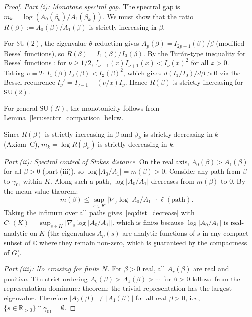\documentclass[12pt]{article}
\theoremstyle{definition}
\theoremstyle{remark}
\newcommand{\SU}{\mathrm{SU}}
\newcommand{\R}{\mathbb{R}}
\newcommand{\C}{\mathbb{C}}
\begin{document}
\begin{proof}
\emph{Part (i): Monotone spectral gap.}
The spectral gap is $m_k = \log(A_0(\beta_k)/A_1(\beta_k))$.
We must show that the ratio $R(\beta) := A_0(\beta)/A_1(\beta)$ is
strictly increasing in $\beta$.

For $\SU(2)$, the eigenvalue $\theta$ reduction gives
$A_p(\beta) = I_{2p+1}(\beta)/\beta$ (modified Bessel functions),
so $R(\beta) = I_1(\beta)/I_3(\beta)$.
By the Tur\'an-type inequality for Bessel functions
\cite{Baricz2008}: for $\nu \ge 1/2$,
$I_{\nu-1}(x) I_{\nu+1}(x) < I_\nu(x)^2$ for all $x > 0$.
Taking $\nu = 2$: $I_1(\beta)I_3(\beta) < I_2(\beta)^2$, which
gives $d(I_1/I_3)/d\beta > 0$ via the Bessel
recurrence $I_\nu' = I_{\nu-1} - (\nu/x)I_\nu$.
Hence $R(\beta)$ is strictly increasing for $\SU(2)$.

For general $\SU(N)$, the monotonicity follows from
Lemma~\ref{lem:sector_comparison} below.

Since $R(\beta)$ is strictly increasing in $\beta$ and $\beta_k$
is strictly decreasing in $k$ (Axiom~C), $m_k = \log R(\beta_k)$
is strictly decreasing in $k$.

\emph{Part (ii): Spectral control of Stokes distance.}
On the real axis, $A_0(\beta) > A_1(\beta)$ for all $\beta > 0$
(part (iii)), so $\log|A_0/A_1| = m(\beta) > 0$.  Consider any
path from $\beta$ to $\gamma_{01}$ within $K$.  Along such a path,
$\log|A_0/A_1|$ decreases from $m(\beta)$ to $0$.  By the mean
value theorem:
\[
m(\beta) \le \sup_{s \in K} |\nabla_s \log|A_0/A_1|| \cdot
\ell(\text{path}).
\]
Taking the infimum over all paths gives~\eqref{eq:dist_decrease}
with $C_1(K) = \sup_{s \in K} |\nabla_s \log|A_0/A_1||$, which is
finite because $\log|A_0/A_1|$ is real-analytic on $K$ (the
eigenvalues $A_p(s)$ are analytic functions of $s$ in any compact
subset of $\C$ where they remain non-zero, which is guaranteed by
the compactness of $G$).

\emph{Part (iii): No crossing for finite $N$.}
For $\beta > 0$ real, all $A_p(\beta)$ are real and positive.
The strict ordering $A_0(\beta) > A_1(\beta) > \cdots$ for $\beta > 0$
follows from the representation dominance theorem: the trivial
representation has the largest eigenvalue.
Therefore $|A_0(\beta)| \ne |A_1(\beta)|$ for all real $\beta > 0$,
i.e., $\{s \in \R_{>0}\} \cap \gamma_{01} = \emptyset$.
\end{proof}
\end{document}
